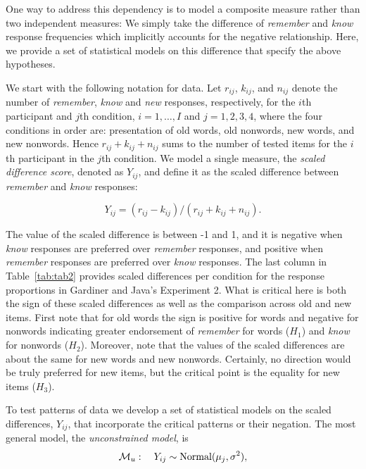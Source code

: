 \documentclass[english,,man,floatsintext]{apa6}
\begin{document}
One way to address this dependency is to model a composite measure rather than two independent measures: We simply take the difference of \emph{remember} and \emph{know} response frequencies which implicitly accounts for the negative relationship. Here, we provide a set of statistical models on this difference that specify the above hypotheses.

We start with the following notation for data. Let \(r_{ij}\), \(k_{ij}\), and \(n_{ij}\) denote the number of \emph{remember}, \emph{know} and \emph{new} responses, respectively, for the \(i\)th participant and \(j\)th condition, \(i=1,\ldots,I\) and \(j=1, 2, 3, 4\), where the four conditions in order are: presentation of old words, old nonwords, new words, and new nonwords. Hence \(r_{ij} + k_{ij} + n_{ij}\) sums to the number of tested items for the \(i\)th participant in the \(j\)th condition. We model a single measure, the \emph{scaled difference score}, denoted as \(Y_{ij}\), and define it as the scaled difference between \emph{remember} and \emph{know} responses:

\begin{equation} \label{eq:yij}
Y_{ij}=(r_{ij} - k_{ij})/(r_{ij} + k_{ij} + n_{ij}).
\end{equation}

The value of the scaled difference is between -1 and 1, and it is negative when \emph{know} responses are preferred over \emph{remember} responses, and positive when \emph{remember} responses are preferred over \emph{know} responses. The last column in Table~\ref{tab:tab2} provides scaled differences per condition for the response proportions in Gardiner and Java's Experiment 2. What is critical here is both the sign of these scaled differences as well as the comparison across old and new items. First note that for old words the sign is positive for words and negative for nonwords indicating greater endorsement of \emph{remember} for words (\(H_1\)) and \emph{know} for nonwords (\(H_2\)). Moreover, note that the values of the scaled differences are about the same for new words and new nonwords. Certainly, no direction would be truly preferred for new items, but the critical point is the equality for new items (\(H_3\)).

To test patterns of data we develop a set of statistical models on the scaled differences, \(Y_{ij}\), that incorporate the critical patterns or their negation. The most general model, the \emph{unconstrained model}, is
\[
{\cal M}_u: \quad Y_{ij}\sim\mbox{Normal}(\mu_j,\sigma^2),
\]
\end{document}
